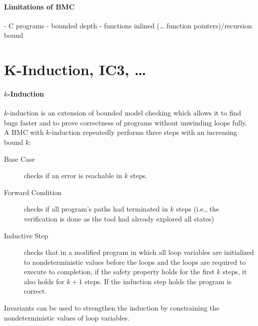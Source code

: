 \paragraph{Limitations of BMC}

- C programs
- bounded depth
- functions inlined (… function pointers)/recursion bound

\section{K-Induction, IC3, …}

\paragraph{$k$-Induction}

$k$-induction is an extension of bounded model checking which allows it to find bugs faster and to prove correctness of programs without unwinding loops fully.
A BMC with $k$-induction repeatedly performs three steps with an increasing bound $k$:
\begin{description}
    \item[Base Case] checks if an error is reachable in $k$ steps.
    \item[Forward Condition] checks if all program's paths had terminated in $k$ steps (i.e., the verification is done as the tool had already explored all states)
    \item[Inductive Step] checks that in a modified program in which all loop variables are initialized to nondeterministic values before the loops and the loops are required to execute to completion, if the safety property holds for the first $k$ steps, it also holds for $k+1$ steps. If the induction step holds the program is correct.
\end{description}
Invariants can be used to strengthen the induction by constraining the nondeterministic values of loop variables.
\cite{Cordeiro2016:23-27}

